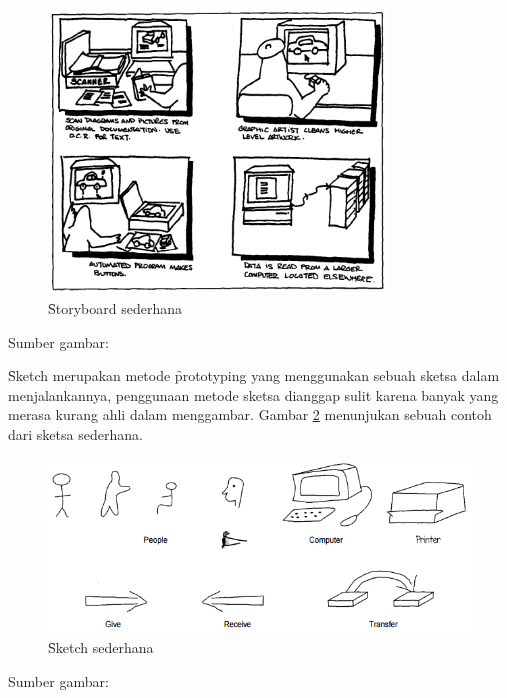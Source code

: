 \begin{figure}
	\centering
	\includegraphics[width=0.8\textwidth]
	{pics/storyboard.PNG}
	\caption{\f{Storyboard} sederhana}
	\label{fig:story}
\end{figure}
\begin{center}
	{\small Sumber gambar: \citep{buku.preece}}
\end{center}
\f{Sketch} merupakan metode \f{prototyping} yang menggunakan sebuah sketsa dalam menjalankannya, penggunaan metode sketsa dianggap sulit karena banyak yang merasa kurang ahli dalam menggambar. Gambar \ref{fig:sketsa} menunjukan sebuah contoh dari sketsa sederhana.
\begin{figure}
	\centering
	\includegraphics[width=\textwidth]
	{pics/simplesketch.PNG}
	\caption{\f{Sketch} sederhana}
	\label{fig:sketsa}
\end{figure}
\begin{center}
	{\small Sumber gambar: \citep{buku.preece}}
\end{center}

